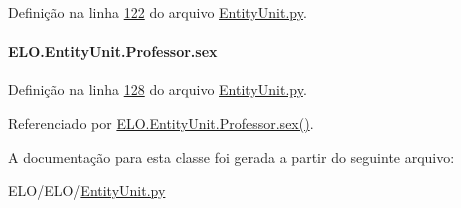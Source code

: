 Definição na linha \hyperlink{EntityUnit_8py_source_l00122}{122} do arquivo \hyperlink{EntityUnit_8py_source}{Entity\-Unit.\-py}.

\hypertarget{classELO_1_1EntityUnit_1_1Professor_ac049dc360c4af27037158e33577288e1}{
\paragraph[{sex}]{\setlength{\rightskip}{0pt plus 5cm}E\-L\-O.\-Entity\-Unit.\-Professor.\-sex}}\label{classELO_1_1EntityUnit_1_1Professor_ac049dc360c4af27037158e33577288e1}


Definição na linha \hyperlink{EntityUnit_8py_source_l00128}{128} do arquivo \hyperlink{EntityUnit_8py_source}{Entity\-Unit.\-py}.



Referenciado por \hyperlink{classELO_1_1EntityUnit_1_1Professor_a2244fa9a5f02a5845cc6c0686b2cf08a}{E\-L\-O.\-Entity\-Unit.\-Professor.\-sex()}.



A documentação para esta classe foi gerada a partir do seguinte arquivo\-:\begin{DoxyCompactItemize}
\item 
E\-L\-O/\-E\-L\-O/\hyperlink{EntityUnit_8py}{Entity\-Unit.\-py}\end{DoxyCompactItemize}
